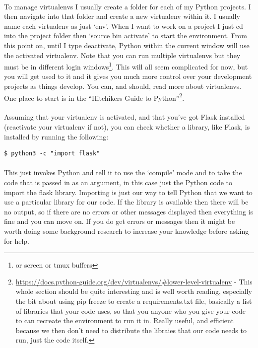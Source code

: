 \documentclass[12pt, a4paper, oneside]{book}
\begin{document}
\paragraph{} To manage virtualenvs I usually create a folder for each of my Python projects. I then navigate into that folder and create a new virtualenv within it. I usually name each virtualenv as just `env'. When I want to work on a project I just cd into the project folder then `source bin activate' to start the environment. From this point on, until I type deactivate, Python within the current window will use the activated virtualenv. Note that you can run multiple virtualenvs but they must be in different login windows\footnote{or screen or tmux buffers}. This will all seem complicated for now, but you will get used to it and it gives you much more control over your development projects as things develop. You can, and should, read more about virtualenvs. One place to start is in the ``Hitchikers Guide to Python''\footnote{\url{https://docs.python-guide.org/dev/virtualenvs/\#lower-level-virtualenv} - This whole section should be quite interesting and is well worth reading, especially the bit about using pip freeze to create a requirements.txt file, basically a list of libraries that your code uses, so that you anyone who you give your code to can recreate the environment to run it in. Really useful, and efficient because we then don't need to distribute the libraies that our code needs to run, just the code itself.}.

\paragraph{} Assuming that your virtualenv is activated, and that you've got Flask installed (reactivate your virtualenv if not), you can check whether a library, like Flask, is installed by running the following:

\begin{lstlisting}[style=DOS]
    $ python3 -c "import flask"
\end{lstlisting}

\paragraph{} This just invokes Python and tell it to use the `compile' mode and to take the code that is passed in as an argument, in this case just the Python code to import the flask library. Importing is just our way to tell Python that we want to use a particular library for our code. If the library is available then there will be no output, so if there are no errors or other messages displayed then everything is fine and you can move on. If you do get errors or messages then it might be worth doing some background research to increase your knowledge before asking for help.
\end{document}
